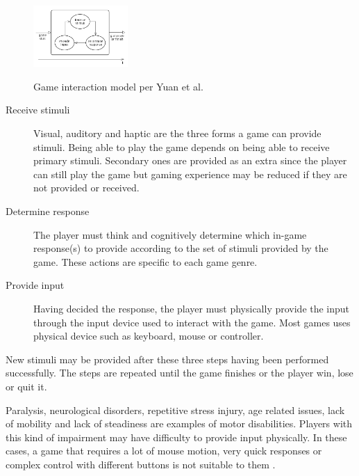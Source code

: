 \documentclass[a4paper]{sbgames}               %
\begin{document}
\begin{figure}['h']
	\centering
	\caption{Game interaction model per Yuan et al.  }
	\includegraphics[width=0.32\textwidth]{./images/game-interaction-model.jpg}
  	\label{fig:gameInteractionModel}
\end{figure}

\begin{description}
\item[Receive stimuli] Visual, auditory and haptic are the three forms a game can provide stimuli. Being able to play the game depends on being able to receive primary stimuli. Secondary ones are provided as an extra since the player can still play the game but gaming experience may be reduced if they are not provided or received.   
\item[Determine response] The player must think and cognitively determine which in-game response(s) to provide according to the set of stimuli provided by the game. These actions are specific to each game genre.
\item[Provide input] Having decided the response, the player must physically provide the input through the input device used to interact with the game. Most games uses physical device such as keyboard, mouse or controller.
\end{description}

New stimuli may be provided after these three steps having been performed successfully. The steps are repeated until the game finishes or the player win, lose or quit it. \cite{yuan2011game}

Paralysis, neurological disorders, repetitive stress injury, age related issues, lack of mobility and lack of steadiness are examples of motor disabilities. Players with this kind of impairment may have difficulty to provide input physically. In these cases, a game that requires a lot of mouse motion, very quick responses or complex control with different buttons is not suitable to them \cite{IGDA2004,Coutinho2011a}.
\end{document}
